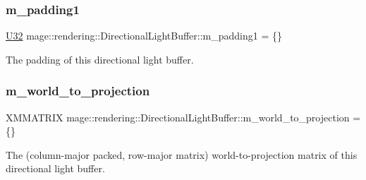 \subsubsection{\texorpdfstring{m\+\_\+padding1}{m\_padding1}}
{\footnotesize\ttfamily \mbox{\hyperlink{namespacemage_aa5d6eaabaac3cdd01873d6a3d27e90f3}{U32}} mage\+::rendering\+::\+Directional\+Light\+Buffer\+::m\+\_\+padding1 = \{\}}

The padding of this directional light buffer. \mbox{\label{structmage_1_1rendering_1_1_directional_light_buffer_ae1c5a43c5dca80be889661a54fb3910b}} 
\subsubsection{\texorpdfstring{m\+\_\+world\+\_\+to\+\_\+projection}{m\_world\_to\_projection}}
{\footnotesize\ttfamily X\+M\+M\+A\+T\+R\+IX mage\+::rendering\+::\+Directional\+Light\+Buffer\+::m\+\_\+world\+\_\+to\+\_\+projection = \{\}}

The (column-\/major packed, row-\/major matrix) world-\/to-\/projection matrix of this directional light buffer. 